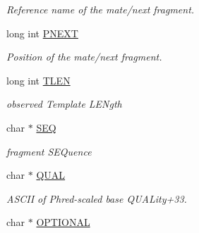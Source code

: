 \begin{CompactItemize}
\begin{CompactList}\small\item\em Reference name of the mate/next fragment. \item\end{CompactList}\item 
\hypertarget{classGenomicRegionSAM_d6f88b4324ba508b86102641d819661f}{
long int \hyperlink{classGenomicRegionSAM_d6f88b4324ba508b86102641d819661f}{PNEXT}}
\label{classGenomicRegionSAM_d6f88b4324ba508b86102641d819661f}

\begin{CompactList}\small\item\em Position of the mate/next fragment. \item\end{CompactList}\item 
\hypertarget{classGenomicRegionSAM_f180854a186be37eab49520edaa1262f}{
long int \hyperlink{classGenomicRegionSAM_f180854a186be37eab49520edaa1262f}{TLEN}}
\label{classGenomicRegionSAM_f180854a186be37eab49520edaa1262f}

\begin{CompactList}\small\item\em observed Template LENgth \item\end{CompactList}\item 
\hypertarget{classGenomicRegionSAM_6c2887ed1fa3a25d801641ea1b139032}{
char $\ast$ \hyperlink{classGenomicRegionSAM_6c2887ed1fa3a25d801641ea1b139032}{SEQ}}
\label{classGenomicRegionSAM_6c2887ed1fa3a25d801641ea1b139032}

\begin{CompactList}\small\item\em fragment SEQuence \item\end{CompactList}\item 
\hypertarget{classGenomicRegionSAM_b43ca5f2fbfdee520f1424c3a9fd0706}{
char $\ast$ \hyperlink{classGenomicRegionSAM_b43ca5f2fbfdee520f1424c3a9fd0706}{QUAL}}
\label{classGenomicRegionSAM_b43ca5f2fbfdee520f1424c3a9fd0706}

\begin{CompactList}\small\item\em ASCII of Phred-scaled base QUALity+33. \item\end{CompactList}\item 
\hypertarget{classGenomicRegionSAM_1622a8804462bad83b1c49d25eeacb49}{
char $\ast$ \hyperlink{classGenomicRegionSAM_1622a8804462bad83b1c49d25eeacb49}{OPTIONAL}}
\label{classGenomicRegionSAM_1622a8804462bad83b1c49d25eeacb49}


\end{CompactItemize}
